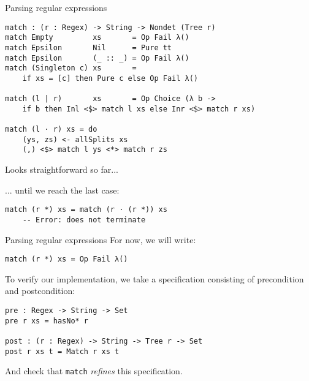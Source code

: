 \documentclass{beamer}
\newcommand{\Agda}[1]{\texttt{\footnotesize #1}\xspace}
\begin{document}
\begin{frame}[fragile]{Parsing regular expressions}
\begin{verbatim}
match : (r : Regex) -> String -> Nondet (Tree r)
match Empty         xs       = Op Fail λ()
match Epsilon       Nil      = Pure tt
match Epsilon       (_ :: _) = Op Fail λ()
match (Singleton c) xs       =
    if xs = [c] then Pure c else Op Fail λ()

match (l | r)       xs       = Op Choice (λ b ->
    if b then Inl <$> match l xs else Inr <$> match r xs)

match (l · r) xs = do
    (ys, zs) <- allSplits xs
    (,) <$> match l ys <*> match r zs
\end{verbatim}
Looks straightforward so far...

\pause
... until we reach the last case:
\vspace{-\baselineskip}
\begin{verbatim}
match (r *) xs = match (r · (r *)) xs
    -- Error: does not terminate
\end{verbatim}

\end{frame}

\begin{frame}[fragile]{Parsing regular expressions}
For now, we will write:
\vspace{-\baselineskip}
\begin{verbatim}
match (r *) xs = Op Fail λ()
\end{verbatim}
\vspace{\baselineskip}

\pause

To verify our implementation, we take a specification consisting of precondition and postcondition:
\begin{verbatim}
pre : Regex -> String -> Set
pre r xs = hasNo* r

post : (r : Regex) -> String -> Tree r -> Set
post r xs t = Match r xs t
\end{verbatim}

And check that \Agda{match} \emph{refines} this specification.

\end{frame}
\end{document}
